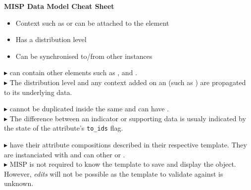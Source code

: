 \begin{center}{
    \huge{\textbf{MISP Data Model Cheat Sheet}}}\\
\end{center}

\begin{multicols*}{3}
    \begin{minipage}{0.3\textwidth}
        \begin{itemize}[noitemsep,topsep=2pt,parsep=0pt,partopsep=0pt]
            \item[\taggable] Context such as \taxonomies or \clusters can be attached to the element
            \item[\distributable] Has a distribution level 
            \item[\synchronisable] Can be synchronised to/from other instances
        \end{itemize}
    \end{minipage}
    \vspace*{0.5em}

        {
            $\blacktriangleright$ \events can contain other elements such as \attributes, \objects and \eventreports.\\
            $\blacktriangleright$ The distribution level and any context added on an \event (such as \taxonomies) are propagated to its underlying data.
        }

        {
            $\blacktriangleright$ \attributes cannot be duplicated inside the same \event and can have \sightings.\\
            $\blacktriangleright$ The difference between an indicator or supporting data is usualy indicated by the state of the attribute's \texttt{to\_ids} flag.
        }

        {
            $\blacktriangleright$ \objects have their attribute compositions described in their respective template. They are instanciated with \attributes and can  other \attributes or \objects.\\
            $\blacktriangleright$ MISP is not required to know the template to save and display the object. However, \textit{edits} will not be possible as the template to validate against is unknown.
        }
    \columnbreak


\end{multicols*}
